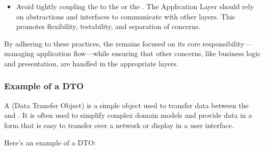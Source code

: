 \documentclass[letterpaper,10pt,english]{sphinxhowto}
\begin{document}
\begin{itemize}
\begin{description}
\end{description}

\item {} \begin{description}
\sphinxAtStartPar
Avoid tightly coupling the  to the  or the . The Application Layer should rely on abstractions and interfaces to communicate with other layers. This promotes flexibility, testability, and separation of concerns.

\end{description}

\end{itemize}

\sphinxAtStartPar
By adhering to these practices, the  remains focused on its core responsibility—managing application flow—while ensuring that other concerns, like business logic and presentation, are handled in the appropriate layers.


\subsubsection{Example of a DTO}
\label{\detokenize{architecture/application/index:example-of-a-dto}}
\sphinxAtStartPar
A  (Data Transfer Object) is a simple object used to transfer data between the  and . It is often used to simplify complex domain models and provide data in a form that is easy to transfer over a network or display in a user interface.

\sphinxAtStartPar
Here’s an example of a DTO:
\end{document}
